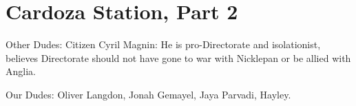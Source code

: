 \setcounter{chapter}{ 3 }
\chapter{\textbf{Cardoza Station, Part 2} }




\noindent\hrulefill





Other Dudes:  Citizen Cyril Magnin: He is pro-Directorate and isolationist, believes Directorate should not have gone to war with Nicklepan or be allied with Anglia.



Our Dudes: Oliver Langdon, Jonah Gemayel, Jaya Parvadi, Hayley.



